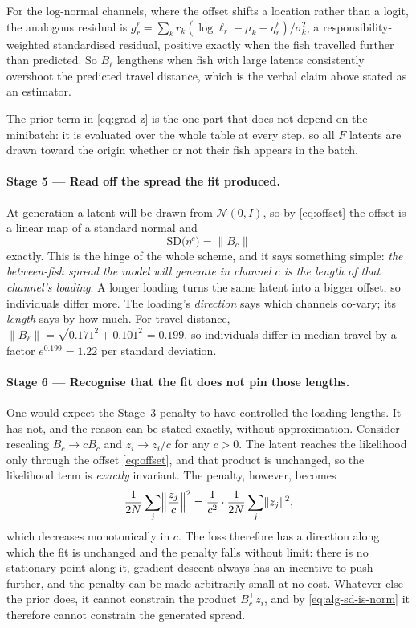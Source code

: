 For the log-normal channels, where the offset shifts a location rather than a
logit, the analogous residual is
$g^{\ell}_{r}=\sum_k r_k(\log\ell_r-\mu_k-\eta^{\ell}_{r})/\sigma_k^{2}$, a
responsibility-weighted standardised residual, positive exactly when the fish
travelled further than predicted. So $B_\ell$ lengthens when fish with large
latents consistently overshoot the predicted travel distance, which is the
verbal claim above stated as an estimator.

The prior term in \eqref{eq:grad-z} is the one part that does not depend on the
minibatch: it is evaluated over the whole table at every step, so all $F$
latents are drawn toward the origin whether or not their fish appears in the
batch.

\paragraph{Stage 5 --- Read off the spread the fit produced.}
At generation a latent will be drawn from $\mathcal{N}(0,I)$, so by
\eqref{eq:offset} the offset is a linear map of a standard normal and
\begin{equation}
\mathrm{SD}\bigl(\eta^{c}\bigr)=\lVert B_c\rVert
\label{eq:alg-sd-is-norm}
\end{equation}
exactly. This is the hinge of the whole scheme, and it says something simple:
\emph{the between-fish spread the model will generate in channel $c$ is the
length of that channel's loading}. A longer loading turns the same latent into a
bigger offset, so individuals differ more. The loading's \emph{direction} says
which channels co-vary; its \emph{length} says by how much. For travel distance,
$\lVert B_\ell\rVert=\sqrt{0.171^2+0.101^2}=0.199$, so individuals differ in
median travel by a factor $e^{0.199}=1.22$ per standard deviation.

\paragraph{Stage 6 --- Recognise that the fit does not pin those lengths.}
One would expect the Stage~3 penalty to have controlled the loading lengths.
It has not, and the reason can be stated exactly, without approximation.
Consider rescaling $B_c\to cB_c$ and $z_i\to z_i/c$ for any $c>0$. The latent
reaches the likelihood only through the offset \eqref{eq:offset}, and that
product is unchanged, so the likelihood term is \emph{exactly} invariant. The
penalty, however, becomes
\begin{equation}
\frac{1}{2N}\sum_j\Bigl\lVert \frac{z_j}{c}\Bigr\rVert^{2}
=\frac{1}{c^{2}}\cdot\frac{1}{2N}\sum_j\lVert z_j\rVert^{2},
\label{eq:scale-degeneracy}
\end{equation}
which decreases monotonically in $c$. The loss therefore has a direction along
which the fit is unchanged and the penalty falls without limit: there is no
stationary point along it, gradient descent always has an incentive to push
further, and the penalty can be made arbitrarily small at no cost. Whatever
else the prior does, it cannot constrain the product $B_c^{\top}z_i$, and by
\eqref{eq:alg-sd-is-norm} it therefore cannot constrain the generated spread.

